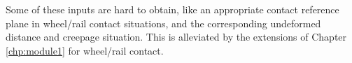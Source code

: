\documentclass[12pt]{report}
\renewcommand{\magenta}[1]{}
\begin{document}
Some of these inputs are hard to obtain, like an appropriate contact
reference plane in wheel/rail contact situations, and the corresponding
undeformed distance and creepage situation. This is alleviated by the
extensions of Chapter \ref{chp:module1} for wheel/rail contact.

\magenta{
\chapter{Wheel and rail profiles}


\section{Requirements for rail profiles}

\begin{figure}[bt]
\centering
\psfig{figure=fig/rail_profiles,width=5.8in,trim=150 45 130 50,clip=}
\caption{\em Variety of rail profiles that should be supported.}
\label{fig:rail_profiles}
\end{figure}

}
\end{document}
